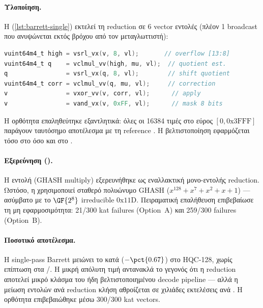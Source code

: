 \paragraph{Υλοποίηση.}
Η  (\cref{lst:barrett-single}) εκτελεί τη reduction σε \num{6} vector
εντολές (πλέον \num{1}  broadcast που ανυψώνεται εκτός
βρόχου από τον μεταγλωττιστή):

\begin{lstlisting}[language=C, caption={Single-pass Barrett reduction μέσω \insn{vclmul.vv}.},
  label={lst:barrett-single}]
vuint64m4_t high = vsrl_vx(v, 8, vl);       // overflow [13:8]
vuint64m4_t q    = vclmul_vv(high, mu, vl);  // quotient est.
q                = vsrl_vx(q, 8, vl);        // shift quotient
vuint64m4_t corr = vclmul_vv(q, mu, vl);     // correction
v                = vxor_vv(v, corr, vl);      // apply
v                = vand_vx(v, 0xFF, vl);      // mask 8 bits
\end{lstlisting}

Η ορθότητα επαληθεύτηκε εξαντλητικά: όλες οι \num{16384} τιμές στο
εύρος $[0, \text{0x3FFF}]$ παράγουν ταυτόσημο αποτέλεσμα με τη reference
.  Η βελτιστοποίηση εφαρμόζεται τόσο στο
 όσο και στο .

\paragraph{Εξερεύνηση  ().}
Η εντολή  (GHASH multiply) εξερευνήθηκε ως εναλλακτική
μονο-εντολής reduction.  Ωστόσο, η  χρησιμοποιεί σταθερό
πολυώνυμο GHASH ($x^{128} + x^7 + x^2 + x + 1$) — ασύμβατο με το
$\GF{2^8}$ irreducible $\text{0x11D}$.  Πειραματική επαλήθευση επιβεβαίωσε
τη μη εφαρμοσιμότητα: \num{21}/\num{300} \gls{kat} failures (Option~A)
και \num{259}/\num{300} failures (Option~B).

\paragraph{Ποσοτικό αποτέλεσμα.}
Η single-pass Barrett μειώνει το \Decaps \instret κατά 
($-\pct{0.67}$) στο HQC-128, χωρίς επίπτωση στα \KeyGen/\Encaps.  Η
μικρή απόλυτη τιμή αντανακλά το γεγονός ότι η reduction αποτελεί μικρό
κλάσμα του ήδη βελτιστοποιημένου decode pipeline — αλλά η  μείωση
εντολών ανά reduction κλήση αθροίζεται σε χιλιάδες εκτελέσεις ανά \Decaps.
Η ορθότητα επιβεβαιώθηκε μέσω \num{300}/\num{300} \gls{kat} vectors.

